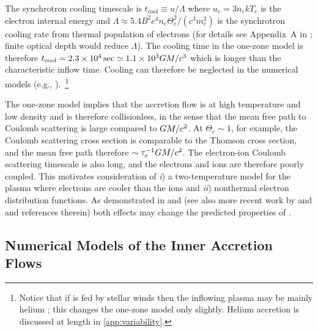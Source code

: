 The synchrotron cooling timescale is $t_\mathrm{cool} \equiv u/\Lambda$ where $u_e = 3 n_e k T_e$ is the electron internal energy and $\Lambda \approx 5.4 B^2 e^4 n_e \Theta_e^2 /(c^3 m_e^2)$ is the synchrotron cooling rate from thermal population of electrons (for details see Appendix~A in \citealt{2011ApJ...735....9M}; finite optical depth would reduce $\Lambda$). The cooling time in the one-zone model is therefore $t_\mathrm{cool}=2.3 \times 10^4\sec \simeq 1.1 \times 10^3 GM/c^3$ which is longer than the characteristic inflow time. Cooling can therefore be neglected in the numerical models (e.g., \citealt{2012MNRAS.426.1928D}).~\footnote{Notice that if \sgra is fed by stellar winds then the inflowing plasma may be mainly helium \citep{2019MNRAS.482L.123R}; this changes the one-zone model only slightly.  Helium accretion is discussed at length in \ref{app:variability}.}

The one-zone model implies that the accretion flow is at high temperature and low density and is therefore collisionless, in the sense that the mean free path to Coulomb scattering is large compared to $GM/c^2$. At $\Theta_e \sim 1$, for example, the Coulomb scattering cross section is comparable to the Thomson cross section, and the mean free path therefore $\sim \tau_e^{-1} GM/c^2$. The electron-ion Coulomb scattering timescale is also long, and the electrons and ions are therefore poorly coupled.  This motivates consideration of \emph{i}) a two-temperature model for the plasma where electrons are cooler than the ions \citep{1976ApJ...204..187S,1977ApJ...214..840I, 1982Natur.295...17R} and \emph{ii}) nonthermal electron distribution functions. As demonstrated in \citet{2000ApJ...541..234O} and \citet{2009ApJ...701..521C} (see also more recent work by \citet{2014A&A...570A...7M} and \citealt{2018A&A...612A..34D} and references therein) both effects may change the predicted properties of \sgra.

\subsection{Numerical Models of the Inner Accretion Flows}

